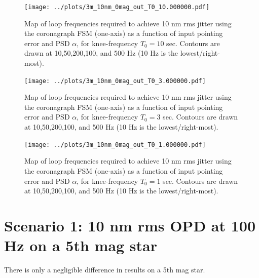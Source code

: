 \documentclass[10pt,preprint]{aastex631}
\begin{document}
\begin{figure}[h!]
\centering
\texttt{[image: ../plots/3m\_10nm\_0mag\_out\_T0\_10.000000.pdf]}
\caption{Map of loop frequencies required to achieve 10 nm rms jitter using the coronagraph FSM (one-axis) as a function of input pointing error and PSD $\alpha$, for knee-frequency $T_0 = 10$ sec.  Contours are drawn at 10,50,200,100, and 500 Hz (10 Hz is the lowest/right-most).  \label{fig:s1_T0-10}}
\end{figure}

\begin{figure}[h!]
\centering
\texttt{[image: ../plots/3m\_10nm\_0mag\_out\_T0\_3.000000.pdf]}
\caption{Map of loop frequencies required to achieve 10 nm rms jitter using the coronagraph FSM (one-axis) as a function of input pointing error and PSD $\alpha$, for knee-frequency $T_0 = 3$ sec.  Contours are drawn at 10,50,200,100, and 500 Hz (10 Hz is the lowest/right-most).  \label{fig:s1_T0-1}}
\end{figure}

\begin{figure}[h!]
\centering
\texttt{[image: ../plots/3m\_10nm\_0mag\_out\_T0\_1.000000.pdf]}
\caption{Map of loop frequencies required to achieve 10 nm rms jitter using the coronagraph FSM (one-axis) as a function of input pointing error and PSD $\alpha$, for knee-frequency $T_0 = 1$ sec.  Contours are drawn at 10,50,200,100, and 500 Hz (10 Hz is the lowest/right-most).  \label{fig:s1_T0-1}}
\end{figure}

\clearpage
\section{Scenario 1: 10 nm rms OPD at 100 Hz on a 5th mag star}

There is only a negligible difference in results on a 5th mag star.
\end{document}
